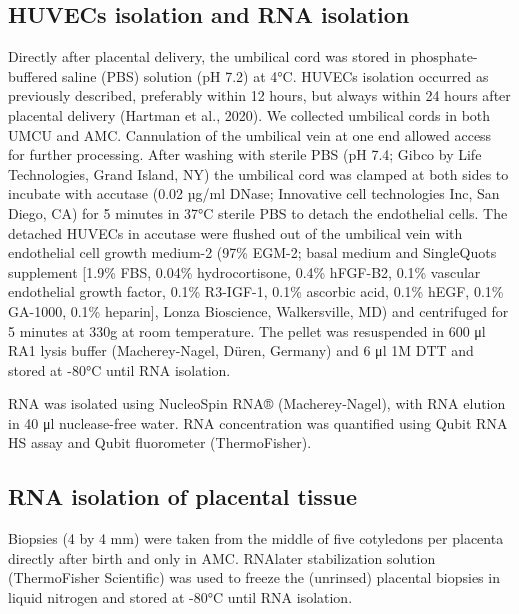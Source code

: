 \documentclass[authordate, empirical,issue]{jote-new-article}
\begin{document}
\subsection{HUVECs isolation and RNA isolation }



Directly after placental delivery, the umbilical cord was stored in phosphate-buffered saline (PBS) solution (pH 7.2) at 4°C. HUVECs isolation occurred as previously described, preferably within 12 hours, but always within 24 hours after placental delivery (Hartman et al., 2020). We collected umbilical cords in both UMCU and AMC. Cannulation of the umbilical vein at one end allowed access for further processing. After washing with sterile PBS (pH 7.4; Gibco by Life Technologies, Grand Island, NY) the umbilical cord was clamped at both sides to incubate with accutase (0.02 µg/ml DNase; Innovative cell technologies Inc, San Diego, CA) for 5 minutes in 37°C sterile PBS to detach the endothelial cells. The detached HUVECs in accutase were flushed out of the umbilical vein with endothelial cell growth medium-2 (97\% EGM-2; basal medium and SingleQuots supplement [1.9\% FBS, 0.04\% hydrocortisone, 0.4\% hFGF-B2, 0.1\% vascular endothelial growth factor, 0.1\% R3-IGF-1, 0.1\% ascorbic acid, 0.1\% hEGF, 0.1\% GA-1000, 0.1\% heparin], Lonza Bioscience, Walkersville, MD) and centrifuged for 5 minutes at 330g at room temperature. The pellet was resuspended in 600 μl RA1 lysis buffer (Macherey-Nagel, Düren, Germany) and 6 μl 1M DTT and stored at -80°C until RNA isolation.



RNA was isolated using NucleoSpin RNA® (Macherey-Nagel), with RNA elution in 40 μl nuclease-free water. RNA concentration was quantified using Qubit RNA HS assay and Qubit fluorometer (ThermoFisher).







\subsection{RNA isolation of placental tissue}



Biopsies (4 by 4 mm) were taken from the middle of five cotyledons per placenta directly after birth and only in AMC. RNAlater stabilization solution (ThermoFisher Scientific) was used to freeze the (unrinsed) placental biopsies in liquid nitrogen and stored at -80°C until RNA isolation.
\end{document}
